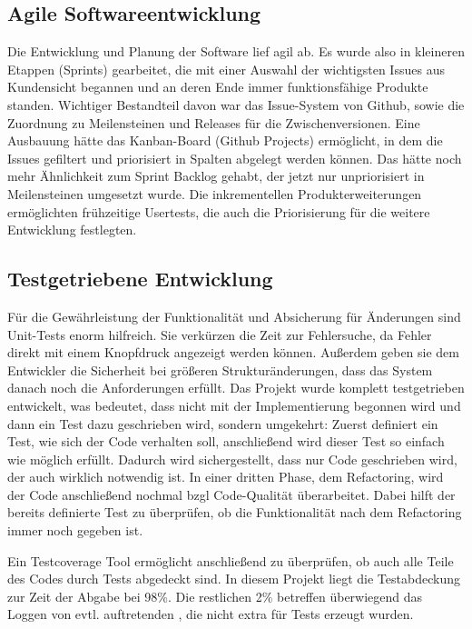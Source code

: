 \subsection{Agile Softwareentwicklung} %
\label{sub:agile_softwareentwicklung}
Die Entwicklung und Planung der Software lief agil ab. Es wurde also in kleineren Etappen (Sprints) gearbeitet, die mit einer Auswahl der wichtigsten Issues aus Kundensicht begannen und an deren Ende immer funktionsfähige Produkte standen. Wichtiger Bestandteil davon war das Issue-System von Github, sowie die Zuordnung zu Meilensteinen und Releases für die Zwischenversionen. Eine Ausbauung hätte das Kanban-Board (Github Projects) ermöglicht, in dem die Issues gefiltert und priorisiert in Spalten abgelegt werden können. Das hätte noch mehr Ähnlichkeit zum Sprint Backlog gehabt, der jetzt nur unpriorisiert in Meilensteinen umgesetzt wurde. Die inkrementellen Produkterweiterungen ermöglichten frühzeitige Usertests, die auch die Priorisierung für die weitere Entwicklung festlegten.

\subsection{Testgetriebene Entwicklung} %
\label{sub:testgetriebene_entwicklung}

Für die Gewährleistung der Funktionalität und Absicherung für Änderungen sind Unit-Tests enorm hilfreich. Sie verkürzen die Zeit zur Fehlersuche, da Fehler direkt mit einem Knopfdruck angezeigt werden können. Außerdem geben sie dem Entwickler die Sicherheit bei größeren Strukturänderungen, dass das System danach noch die Anforderungen erfüllt. Das Projekt wurde komplett testgetrieben entwickelt, was bedeutet, dass nicht mit der Implementierung begonnen wird und dann ein Test dazu geschrieben wird, sondern umgekehrt: Zuerst definiert ein Test, wie sich der Code verhalten soll, anschließend wird dieser Test so einfach wie möglich erfüllt. Dadurch wird sichergestellt, dass nur Code geschrieben wird, der auch wirklich notwendig ist. In einer dritten Phase, dem Refactoring, wird der Code anschließend nochmal bzgl Code-Qualität überarbeitet. Dabei hilft der bereits definierte Test zu überprüfen, ob die Funktionalität nach dem Refactoring immer noch gegeben ist. 

Ein Testcoverage Tool ermöglicht anschließend zu überprüfen, ob auch alle Teile des Codes durch Tests abgedeckt sind. In diesem Projekt liegt die Testabdeckung zur Zeit der Abgabe bei 98\%. Die restlichen 2\% betreffen überwiegend das Loggen von evtl. auftretenden , die nicht extra für Tests erzeugt wurden.

